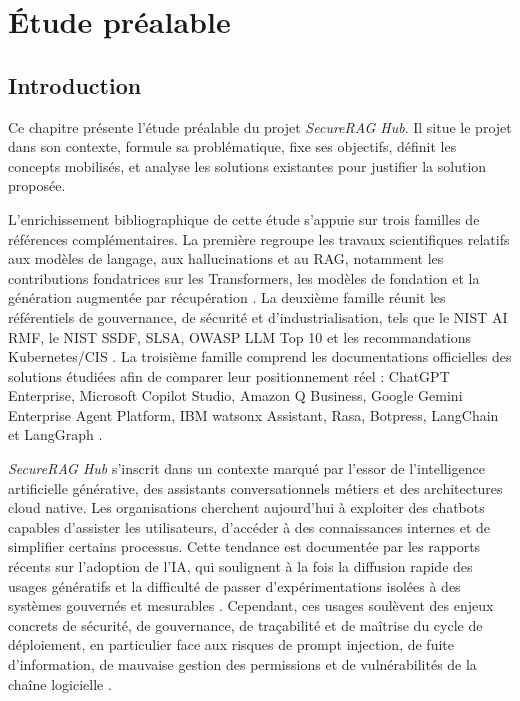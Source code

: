 \chapter{Étude préalable}
\fancyhead[L]{\leftmark}

\section{Introduction}

Ce chapitre présente l’étude préalable du projet \textit{SecureRAG Hub}. Il situe le projet dans son contexte, formule sa problématique, fixe ses objectifs, définit les concepts mobilisés, et analyse les solutions existantes pour justifier la solution proposée.

L’enrichissement bibliographique de cette étude s’appuie sur trois familles de références complémentaires. La première regroupe les travaux scientifiques relatifs aux modèles de langage, aux hallucinations et au RAG, notamment les contributions fondatrices sur les Transformers, les modèles de fondation et la génération augmentée par récupération \cite{vaswani_transformer_2017,bommasani_foundation_models_2021,lewis_rag_2020,gao_rag_survey_2024,ji_hallucination_survey_2023}. La deuxième famille réunit les référentiels de gouvernance, de sécurité et d’industrialisation, tels que le NIST AI RMF, le NIST SSDF, SLSA, OWASP LLM Top 10 et les recommandations Kubernetes/CIS \cite{nist_ai_rmf_2023,nist_ssdf_800_218,slsa_spec_v1,owasp_llm_top10_2025,cis_kubernetes_benchmark,k8s_pod_security_standards}. La troisième famille comprend les documentations officielles des solutions étudiées afin de comparer leur positionnement réel : ChatGPT Enterprise, Microsoft Copilot Studio, Amazon Q Business, Google Gemini Enterprise Agent Platform, IBM watsonx Assistant, Rasa, Botpress, LangChain et LangGraph \cite{openai_enterprise_admin_2026,microsoft_copilot_studio_2026,aws_q_business_2026,google_agent_platform_2026,ibm_watsonx_2026,rasa_docs_2026,botpress_docs_2026,langchain_retrieval_2026,langgraph_agentic_rag_2026}.


\textit{SecureRAG Hub} s’inscrit dans un contexte marqué par l’essor de l’intelligence artificielle générative, des assistants conversationnels métiers et des architectures cloud native. Les organisations cherchent aujourd’hui à exploiter des chatbots capables d’assister les utilisateurs, d’accéder à des connaissances internes et de simplifier certains processus. Cette tendance est documentée par les rapports récents sur l’adoption de l’IA, qui soulignent à la fois la diffusion rapide des usages génératifs et la difficulté de passer d’expérimentations isolées à des systèmes gouvernés et mesurables \cite{stanford_ai_index_2025,mckinsey_state_ai_2025}. Cependant, ces usages soulèvent des enjeux concrets de sécurité, de gouvernance, de traçabilité et de maîtrise du cycle de déploiement, en particulier face aux risques de prompt injection, de fuite d’information, de mauvaise gestion des permissions et de vulnérabilités de la chaîne logicielle \cite{owasp_llm_top10_2025,nist_ai_rmf_2023,slsa_spec_v1}.


